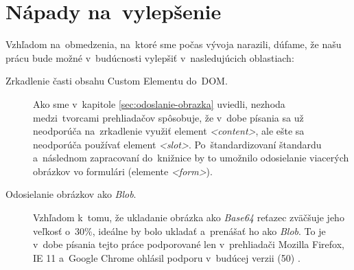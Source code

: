 \section{Nápady na~vylepšenie}

Vzhľadom na~obmedzenia, na~ktoré sme počas vývoja narazili, dúfame, že našu prácu bude možné v~budúcnosti vylepšiť v~nasledujúcich oblastiach:

\begin{description}
	
	\item[Zrkadlenie časti obsahu Custom Elementu do~DOM.] Ako sme v~kapitole \ref{sec:odoslanie-obrazka} uviedli, nezhoda medzi~tvorcami prehliadačov spôsobuje, že v~dobe písania sa už neodporúča na~zrkadlenie využiť element \emph{<content>}, ale ešte sa neodporúča používať element \emph{<slot>}. Po~štandardizovaní štandardu a~následnom zapracovaní do~knižnice by to umožnilo odosielanie viacerých obrázkov vo formulári (elemente \emph{<form>}).
	
	\item[Odosielanie obrázkov ako \emph{Blob}.] Vzhľadom k~tomu, že ukladanie obrázka ako \emph{Base64} reťazec zväčšuje jeho veľkosť o~30\%, ideálne by bolo ukladať a~prenášať ho ako \emph{Blob}. To je v~dobe písania tejto práce podporované len v~prehliadači Mozilla Firefox, IE 11 a~Google Chrome ohlásil podporu v~budúcej verzii (50) \cite{Canvas_toBlob}.
	
\end{description}